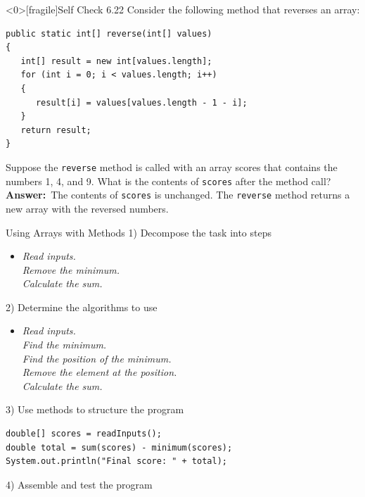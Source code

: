 \documentclass[aspectratio=43,10pt,t]{beamer}
\newcommand{\hiddenslides}{0}
\newcommand{\code}[1]{\texttt{#1}}
\newcommand{\answer}{\textbf{Answer:}\ }
\begin{document}
\begin{frame}<\hiddenslides>[fragile]{Self Check 6.22}
  Consider the following method that reverses an array:
\begin{lstlisting}[linewidth=0.8\linewidth,xleftmargin=8mm,backgroundcolor={},frame=none]
public static int[] reverse(int[] values)
{
   int[] result = new int[values.length];
   for (int i = 0; i < values.length; i++)
   {
      result[i] = values[values.length - 1 - i];
   }
   return result;
}
\end{lstlisting}
  Suppose the \code{reverse} method is called with an array scores that contains the
  numbers 1, 4, and 9. What is the contents of \code{scores} after the method call?
  \vskip3mm
  \answer The contents of \code{scores} is unchanged. The \code{reverse} method returns
  a new array with the reversed numbers.
\end{frame}

\begin{frame}[fragile]{Using Arrays with Methods}
  \small
  1) Decompose the task into steps
  \begin{itemize}
    \item[] \textit{Read inputs.}\\
            \textit{Remove the minimum.}\\
            \textit{Calculate the sum.}
  \end{itemize}
  2) Determine the algorithms to use
  \begin{itemize}
    \item[] \textit{Read inputs.}\\
            \textit{Find the minimum.}\\
            \textit{Find the position of the minimum.}\\
            \textit{Remove the element at the position.}\\
            \textit{Calculate the sum.}
  \end{itemize}
  3) Use methods to structure the program
\begin{lstlisting}[linewidth=0.8\linewidth,xleftmargin=0.08\linewidth]
double[] scores = readInputs();
double total = sum(scores) - minimum(scores);
System.out.println("Final score: " + total);
\end{lstlisting}
  4) Assemble and test the program
\end{frame}
\end{document}
